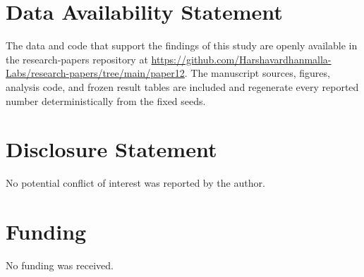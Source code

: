\documentclass[journal]{IEEEtran}
\begin{document}
\section*{Data Availability Statement}
The data and code that support the findings of this study are openly available in the research-papers repository at \url{https://github.com/Harshavardhanmalla-Labs/research-papers/tree/main/paper12}. The manuscript sources, figures, analysis code, and frozen result tables are included and regenerate every reported number deterministically from the fixed seeds.

\section*{Disclosure Statement}
No potential conflict of interest was reported by the author.

\section*{Funding}
No funding was received.
\end{document}
